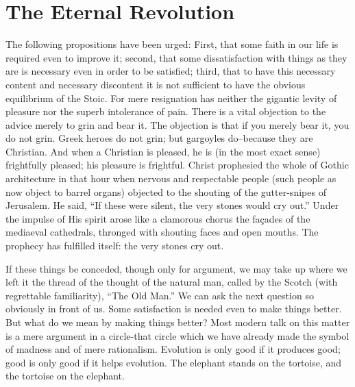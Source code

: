 \documentclass{book}
\begin{document}
\chapter{The Eternal Revolution}
\label{chapter-6}
The following propositions have been urged: First, that some faith in our life is required even to improve it; second, that some dissatisfaction with things as they are is necessary even in order to be satisfied; third, that to have this necessary content and necessary discontent it is not sufficient to have the obvious equilibrium of the Stoic. For mere resignation has neither the gigantic levity of pleasure nor the superb intolerance of pain. There is a vital objection to the advice merely to grin and bear it. The objection is that if you merely bear it, you do not grin. Greek heroes do not grin; but gargoyles do–because they are Christian. And when a Christian is pleased, he is (in the most exact sense) frightfully pleased; his pleasure is frightful. Christ prophesied the whole of Gothic architecture in that hour when nervous and respectable people (such people as now object to barrel organs) objected to the shouting of the gutter-snipes of Jerusalem. He said, “If these were silent, the very stones would cry out.” Under the impulse of His spirit arose like a clamorous chorus the façades of the mediaeval cathedrals, thronged with shouting faces and open mouths. The prophecy has fulfilled itself: the very stones cry out.

If these things be conceded, though only for argument, we may take up where we left it the thread of the thought of the natural man, called by the Scotch (with regrettable familiarity), “The Old Man.” We can ask the next question so obviously in front of us. Some satisfaction is needed even to make things better. But what do we mean by making things better? Most modern talk on this matter is a mere argument in a circle-that circle which we have already made the symbol of madness and of mere rationalism. Evolution is only good if it produces good; good is only good if it helps evolution. The elephant stands on the tortoise, and the tortoise on the elephant.
\end{document}
